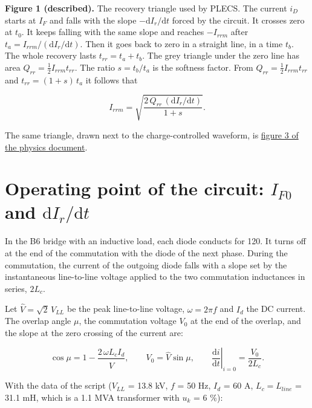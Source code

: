 \documentclass[11pt,a4paper,numbers=noenddot]{scrartcl}
\begin{document}
\begin{onehalfspace}
\textbf{Figure 1 (described).} The recovery triangle used by PLECS. The current \(i_D\) starts at \(I_F\) and falls with the slope \(-\mathrm{d}I_r/\mathrm{d}t\) forced by the circuit. It crosses zero at \(t_0\). It keeps falling with the same slope and reaches \(-I_{rrm}\) after \(t_a = I_{rrm}/(\mathrm{d}I_r/\mathrm{d}t)\). Then it goes back to zero in a straight line, in a time \(t_b\). The whole recovery lasts \(t_{rr} = t_a + t_b\). The grey triangle under the zero line has area \(Q_{rr} = \tfrac{1}{2} I_{rrm} t_{rr}\). The ratio \(s = t_b/t_a\) is the softness factor. From \(Q_{rr} = \tfrac{1}{2} I_{rrm} t_{rr}\) and \(t_{rr} = (1+s)\,t_a\) it follows that

\[I_{rrm} = \sqrt{\frac{2\,Q_{rr}\,(\mathrm{d}I_r/\mathrm{d}t)}{1+s}}.\]

\begin{mybox}
The same triangle, drawn next to the charge-controlled waveform, is \href{https://github.com/pwr-control/Semiconductor-Physics-and-Devices/blob/main/diode-reverse-recovery/figures/fig3_recovery_waveform.svg}{figure 3 of the physics document}.
\end{mybox}

\section{\texorpdfstring{Operating point of the circuit: \(I_{F0}\) and \(\mathrm{d}I_r/\mathrm{d}t\)}{Operating point of the circuit: I\_\{F0\} and \textbackslash mathrm\{d\}I\_r/\textbackslash mathrm\{d\}t}}\label{operating-point-of-the-circuit-i_f0-and-mathrmdi_rmathrmdt}

In the B6 bridge with an inductive load, each diode conducts for 120\textdegree{}. It turns off at the end of the commutation with the diode of the next phase. During the commutation, the current of the outgoing diode falls with a slope set by the instantaneous line-to-line voltage applied to the two commutation inductances in series, \(2L_c\).

Let \(\hat V = \sqrt{2}\,V_{LL}\) be the peak line-to-line voltage, \(\omega = 2\pi f\) and \(I_d\) the DC current. The overlap angle \(\mu\), the commutation voltage \(V_0\) at the end of the overlap, and the slope at the zero crossing of the current are:

\[\cos\mu = 1 - \frac{2\,\omega L_c I_d}{\hat V}, \qquad V_0 = \hat V \sin\mu, \qquad \left.\frac{\mathrm{d}i}{\mathrm{d}t}\right|_{i=0} = \frac{V_0}{2L_c}. \tag{3.1}\]

With the data of the script (\(V_{LL}\) = 13.8 kV, \(f\) = 50 Hz, \(I_d\) = 60 A, \(L_c = L_{line}\) = 31.1 mH, which is a 1.1 MVA transformer with \(u_k\) = 6 \%):


\end{onehalfspace}
\end{document}

